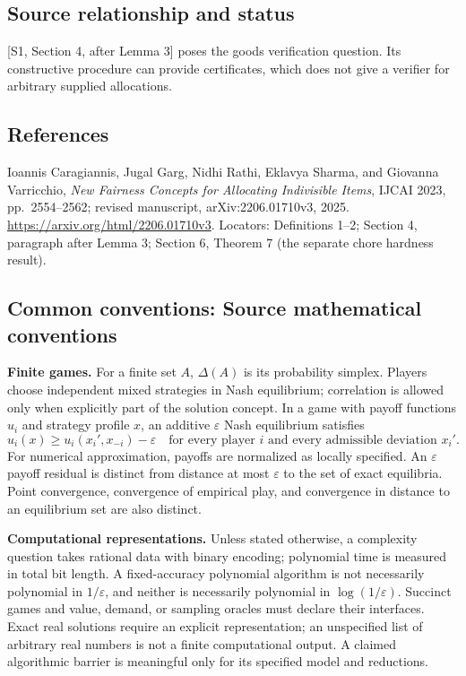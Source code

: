 \documentclass[11pt,a4paper]{article}
\begin{document}
\subsection*{Source relationship and status}
[S1, Section 4, after Lemma 3] poses the goods verification question.
Its constructive procedure can provide certificates, which does not
give a verifier for arbitrary supplied allocations.

\subsection*{References}
\begingroup\footnotesize\raggedright
\noindent[S1] Ioannis Caragiannis, Jugal Garg, Nidhi Rathi,
Eklavya Sharma, and Giovanna Varricchio,
\emph{New Fairness Concepts for Allocating Indivisible Items},
IJCAI 2023, pp.~2554--2562; revised manuscript,
arXiv:2206.01710v3, 2025.
\url{https://arxiv.org/html/2206.01710v3}.
Locators: Definitions 1--2; Section 4, paragraph after Lemma 3;
Section 6, Theorem 7 (the separate chore hardness result).
\par\endgroup

\subsection*{Common conventions: Source mathematical conventions}

\textbf{Finite games.} For a finite set $A$, $\Delta(A)$ is its probability
simplex. Players choose independent mixed strategies in Nash equilibrium;
correlation is allowed only when explicitly part of the solution concept.
In a game with payoff functions $u_i$ and strategy profile $x$, an additive
$\varepsilon$ Nash equilibrium satisfies
\[
 u_i(x)\geq u_i(x_i',x_{-i})-\varepsilon
 \quad\text{for every player $i$ and every admissible deviation $x_i'$}.
\]
For numerical approximation, payoffs are normalized as locally specified.
An $\varepsilon$ payoff residual is distinct from distance at most
$\varepsilon$ to the set of exact equilibria. Point convergence, convergence
of empirical play, and convergence in distance to an equilibrium set are
also distinct.

\textbf{Computational representations.} Unless stated otherwise, a complexity
question takes rational data with binary encoding; polynomial time is measured
in total bit length. A fixed-accuracy polynomial algorithm is not necessarily
polynomial in $1/\varepsilon$, and neither is necessarily polynomial in
$\log(1/\varepsilon)$. Succinct games and value, demand, or sampling oracles
must declare their interfaces. Exact real solutions require an explicit
representation; an unspecified list of arbitrary real numbers is not a
finite computational output. A claimed algorithmic barrier is meaningful
only for its specified model and reductions.
\end{document}
